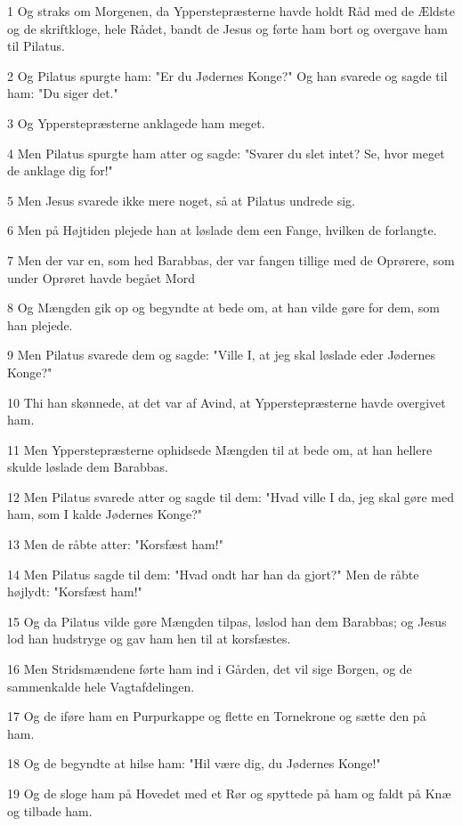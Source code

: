 \par 1 Og straks om Morgenen, da Ypperstepræsterne havde holdt Råd med de Ældste og de skriftkloge, hele Rådet, bandt de Jesus og førte ham bort og overgave ham til Pilatus.
\par 2 Og Pilatus spurgte ham: "Er du Jødernes Konge?" Og han svarede og sagde til ham: "Du siger det."
\par 3 Og Ypperstepræsterne anklagede ham meget.
\par 4 Men Pilatus spurgte ham atter og sagde: "Svarer du slet intet? Se, hvor meget de anklage dig for!"
\par 5 Men Jesus svarede ikke mere noget, så at Pilatus undrede sig.
\par 6 Men på Højtiden plejede han at løslade dem een Fange, hvilken de forlangte.
\par 7 Men der var en, som hed Barabbas, der var fangen tillige med de Oprørere, som under Oprøret havde begået Mord
\par 8 Og Mængden gik op og begyndte at bede om, at han vilde gøre for dem, som han plejede.
\par 9 Men Pilatus svarede dem og sagde: "Ville I, at jeg skal løslade eder Jødernes Konge?"
\par 10 Thi han skønnede, at det var af Avind, at Ypperstepræsterne havde overgivet ham.
\par 11 Men Ypperstepræsterne ophidsede Mængden til at bede om, at han hellere skulde løslade dem Barabbas.
\par 12 Men Pilatus svarede atter og sagde til dem: "Hvad ville I da, jeg skal gøre med ham, som I kalde Jødernes Konge?"
\par 13 Men de råbte atter: "Korsfæst ham!"
\par 14 Men Pilatus sagde til dem: "Hvad ondt har han da gjort?" Men de råbte højlydt: "Korsfæst ham!"
\par 15 Og da Pilatus vilde gøre Mængden tilpas, løslod han dem Barabbas; og Jesus lod han hudstryge og gav ham hen til at korsfæstes.
\par 16 Men Stridsmændene førte ham ind i Gården, det vil sige Borgen, og de sammenkalde hele Vagtafdelingen.
\par 17 Og de iføre ham en Purpurkappe og flette en Tornekrone og sætte den på ham.
\par 18 Og de begyndte at hilse ham: "Hil være dig, du Jødernes Konge!"
\par 19 Og de sloge ham på Hovedet med et Rør og spyttede på ham og faldt på Knæ og tilbade ham.
